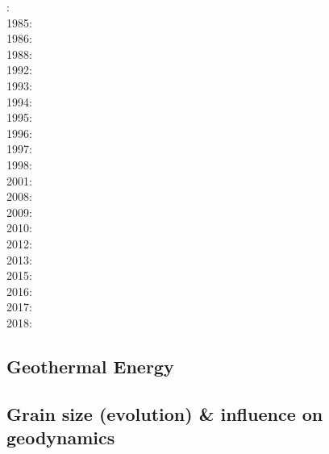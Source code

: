 {\scriptsize
{}: \cite{davi84}\cite{hage84}\cite{riff84}\cite{riha84}\\
1985: \cite{hacr85}\\
1986: \cite{davi86}\\
1988: \cite{besz88}\cite{fope88}\\
1992: \cite{zhgu92}\cite{kiha92}\\
1993: \cite{zhch93}\cite{rirl93}\\
1994: \cite{kiha94}\\
1995: \cite{king95}\cite{mopa95}\\
1996: \cite{mogu96}\\
1997: \cite{wean97a}\\
1998: \cite{cava98}\cite{chki98}\\
2001: \cite{zhon01}\\
2008: \cite{meco08}\\
2009: \cite{king09}\\
2010: \cite{ghbz10}\cite{spgs10b}\\
2012: \cite{hibi12}\\
2013: \cite{shsc13}\cite{chus13}\\
2015: \cite{lizh15}\\
2016: \cite{necg16}\\
2017: \cite{grab17}\\
2018: \cite{king18}
}

\subsection{Geothermal Energy} 

{\scriptsize
\noindent
\cite{quxm15}
\cite{revf19}
}

\subsection{Grain size (evolution) \& influence on geodynamics}
\label{sec:topics:gsev}

